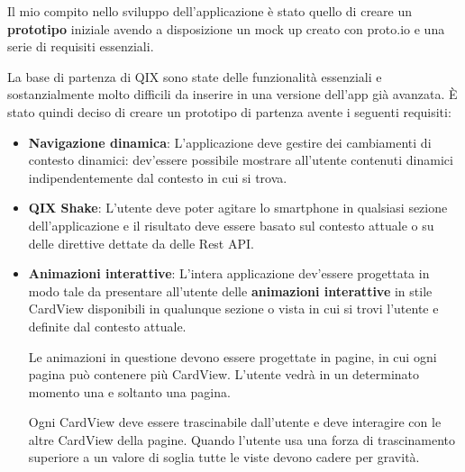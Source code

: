 
Il mio compito nello sviluppo dell'applicazione è stato quello 
di creare un \textbf{prototipo} iniziale avendo a disposizione un mock up creato con
proto.io\cite{protoio} e una serie di requisiti essenziali.


La base di partenza di QIX sono state delle funzionalità essenziali e 
sostanzialmente molto difficili da inserire in una versione dell'app già avanzata.
È stato quindi deciso di creare un prototipo di partenza avente i seguenti requisiti:

\begin{itemize}
    \item {
        \textbf{Navigazione dinamica}: L'applicazione deve gestire dei cambiamenti di contesto
        dinamici: dev'essere possibile mostrare all'utente contenuti dinamici indipendentemente
        dal contesto in cui si trova. 
    }
    \item {
        \textbf{QIX Shake}: L'utente deve poter agitare lo smartphone in qualsiasi
        sezione dell'applicazione e il risultato deve essere basato sul contesto attuale o su delle direttive dettate
        da delle Rest API.
    } 
    \item {
        \textbf{Animazioni interattive}: L'intera applicazione dev'essere progettata in modo tale da presentare all'utente
        delle \textbf{animazioni interattive} in stile CardView\cite{cardview} disponibili in 
        qualunque sezione o vista in cui si trovi l'utente e definite dal contesto attuale.

        Le animazioni in questione devono essere progettate in pagine, in cui ogni pagina può contenere 
        più CardView. L'utente vedrà in un determinato momento una e soltanto una pagina.

        Ogni CardView deve essere trascinabile dall'utente e deve interagire con le altre CardView della pagine. 
        Quando l'utente usa una forza di trascinamento superiore a un valore di soglia tutte le viste devono
        cadere per gravità.
        
}
\end{itemize}
